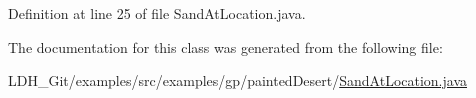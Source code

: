 Definition at line 25 of file Sand\-At\-Location.\-java.



The documentation for this class was generated from the following file\-:\begin{DoxyCompactItemize}
\item 
L\-D\-H\-\_\-\-Git/examples/src/examples/gp/painted\-Desert/\hyperlink{_sand_at_location_8java}{Sand\-At\-Location.\-java}\end{DoxyCompactItemize}
